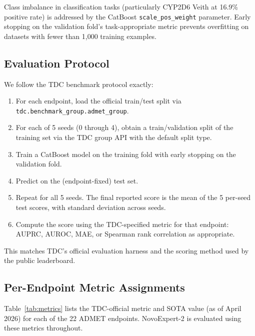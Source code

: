 \documentclass[11pt]{article}
\begin{document}
Class imbalance in classification tasks (particularly CYP2D6 Veith at 16.9\% positive rate) is addressed by the CatBoost \texttt{scale\_pos\_weight} parameter. Early stopping on the validation fold's task-appropriate metric prevents overfitting on datasets with fewer than 1{,}000 training examples.

\subsection{Evaluation Protocol}

We follow the TDC benchmark protocol exactly:

\begin{enumerate}
    \item For each endpoint, load the official train/test split via \texttt{tdc.benchmark\_group.admet\_group}.
    \item For each of 5 seeds (0 through 4), obtain a train/validation split of the training set via the TDC group API with the default split type.
    \item Train a CatBoost model on the training fold with early stopping on the validation fold.
    \item Predict on the (endpoint-fixed) test set.
    \item Repeat for all 5 seeds. The final reported score is the mean of the 5 per-seed test scores, with standard deviation across seeds.
    \item Compute the score using the TDC-specified metric for that endpoint: AUPRC, AUROC, MAE, or Spearman rank correlation as appropriate.
\end{enumerate}

This matches TDC's official evaluation harness and the scoring method used by the public leaderboard.

\subsection{Per-Endpoint Metric Assignments}

Table~\ref{tab:metrics} lists the TDC-official metric and SOTA value (as of April 2026) for each of the 22 ADMET endpoints. NovoExpert-2 is evaluated using these metrics throughout.
\end{document}
